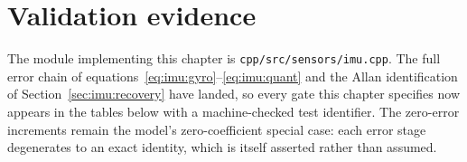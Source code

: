 \section{Validation evidence}
\label{sec:imu:validation}

The module implementing this chapter is
\texttt{cpp/src/sensors/imu.cpp}. The full error chain of
equations~\eqref{eq:imu:gyro}--\eqref{eq:imu:quant} and the Allan
identification of Section~\ref{sec:imu:recovery} have landed, so every gate
this chapter specifies now appears in the tables below with a
machine-checked test identifier. The zero-error increments remain the
model's zero-coefficient special case: each error stage degenerates to an
exact identity, which is itself asserted rather than assumed.

